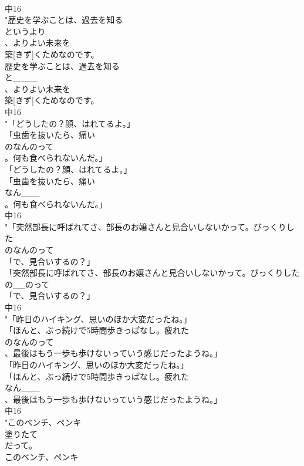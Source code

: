 \documentclass[8pt]{extreport}
\begin{document}
\begin{CJK}{UTF8}{min}
\\	中16
\\	"歴史を学ぶことは、過去を知る
\\	というより
\\	、よりよい未来を
\\	築[きず]くためなのです。
\\	歴史を学ぶことは、過去を知る
\\	と____
\\	、よりよい未来を
\\	築[きず]くためなのです。
\\	中16
\\	"「どうしたの？顔、はれてるよ。」
\\	「虫歯を抜いたら、痛い
\\	のなんのって
\\	。何も食べられないんだ。」
\\	「どうしたの？顔、はれてるよ。」
\\	「虫歯を抜いたら、痛い
\\	なん___
\\	。何も食べられないんだ。」
\\	中16
\\	"「突然部長に呼ばれてさ、部長のお嬢さんと見合いしないかって。びっくりした
\\	のなんのって
\\	「で、見合いするの？」
\\	「突然部長に呼ばれてさ、部長のお嬢さんと見合いしないかって。びっくりした
\\	の__のって
\\	「で、見合いするの？」
\\	中16
\\	"「昨日のハイキング、思いのほか大変だったね。」
\\	「ほんと、ぶっ続けで5時間歩きっぱなし。疲れた
\\	のなんのって
\\	、最後はもう一歩も歩けないっていう感じだったようね。」
\\	「昨日のハイキング、思いのほか大変だったね。」
\\	「ほんと、ぶっ続けで5時間歩きっぱなし。疲れた
\\	なん___
\\	、最後はもう一歩も歩けないっていう感じだったようね。」
\\	中16
\\	"このベンチ、ペンキ
\\	塗りたて
\\	だって。
\\	このベンチ、ペンキ

\end{CJK}
\end{document}
